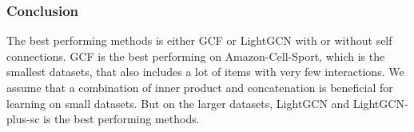 \subsubsection{Conclusion}
The best performing methods is either GCF or LightGCN with or without self connections.
GCF is the best performing on Amazon-Cell-Sport, which is the smallest datasets, that also includes a lot of items with very few interactions.
We assume that a combination of inner product and concatenation is beneficial for learning on small datasets.
But on the larger datasets, LightGCN and LightGCN-plus-sc is the best performing methods.
